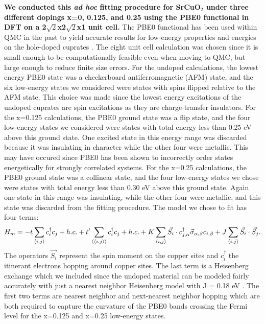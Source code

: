 \documentclass{article}
\begin{document}
\textbf{We conducted this \textit{ad hoc} fitting procedure for SrCuO$_2$ under three different dopings x=0, 0.125, and 0.25 using the PBE0 functional in DFT on a 2$\sqrt{2}$x2$\sqrt{2}$x1 unit cell. }
The PBE0 functional has been used within QMC in the past to yield accurate results for low-energy properties and energies on the hole-doped cuprates \cite{Wagner2015,Narayan2017,Wagner2014}. 
The eight unit cell calculation was chosen since it is small enough to be computationally feasible even when moving to QMC, but large enough to reduce finite size errors. 
For the undoped calculations, the lowest energy PBE0 state was a checkerboard antiferromagnetic (AFM) state, and the six low-energy states we considered were states with spins flipped relative to the AFM state. 
This choice was made since the lowest energy excitations of the undoped cuprates are spin excitations as they are charge-transfer insulators. 
For the x=0.125 calculations, the PBE0 ground state was a flip state, and the four low-energy states we considered were states with total energy less than 0.25 eV above this ground state. 
One excited state in this energy range was discarded because it was insulating in character while the other four were metallic. 
This may have occured since PBE0 has been shown to incorrectly order states energetically for strongly correlated systems.
For the x=0.25 calculations, the PBE0 ground state was a collinear state, and the four low-energy states we chose were states with total energy less than 0.30 eV above this ground state. 
Again one state in this range was insulating, while the other four were metallic, and this state was discarded from the fitting procedure. 
The model we chose to fit has four terms: 
\begin{equation}
H_m = -t \sum_{\langle i,j \rangle} c_i^\dagger c_j + h.c.
+ t^\prime\sum_{\langle \langle i.j \rangle \rangle} c_i^\dagger c_j + h.c. +\\
K\sum_{\langle i,j \rangle} \vec{S_i} \cdot c_{j,\alpha}^\dagger \vec{\sigma}_{\alpha,\beta} c_{i,\beta} + J \sum_{\langle i,j \rangle} \vec{S_i} \cdot \vec{S_j}.
\end{equation}
The operators $\vec{S_i}$ represent the spin moment on the copper sites and $c_i^\dagger$ the itinerant electrons hopping around copper sites. 
The last term is a Heisenberg exchange which we included since the undoped material can be modeled fairly accurately with just a nearest neighbor Heisenberg model with J = 0.18 eV \cite{Wagner2014}. 
The first two terms are nearest neighbor and next-nearest neighbor hopping which are both required to capture the curvature of the PBE0 bands crossing the Fermi level for the x=0.125 and x=0.25 low-energy states. 
\end{document}
